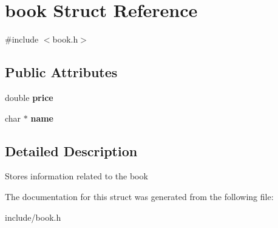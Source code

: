 \hypertarget{structbook}{}\section{book Struct Reference}
\label{structbook}


{\ttfamily \#include $<$book.\+h$>$}

\subsection*{Public Attributes}
\begin{DoxyCompactItemize}
\item 
\mbox{\label{structbook_a609c33ac7e1c269eab47af9acaeb7116}} 
double {\bfseries price}
\item 
\mbox{\label{structbook_af17cc9388c84e45b072e9f9dbffef1e5}} 
char $\ast$ {\bfseries name}
\end{DoxyCompactItemize}


\subsection{Detailed Description}
Stores information related to the book 

The documentation for this struct was generated from the following file\+:\begin{DoxyCompactItemize}
\item 
include/book.\+h\end{DoxyCompactItemize}
